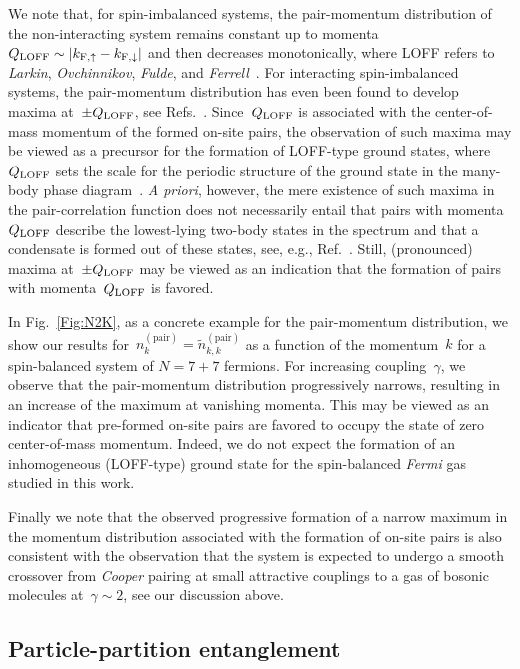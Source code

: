 \documentclass[pra,aps,groupedaddress,floatfix,twocolumn,superscriptaddress,showpacs,nofootinbib]{revtex4-1}
\begin{document}
{{{We note that, for  spin-imbalanced systems, the pair-momentum distribution
of the non-interacting system remains constant up
to momenta~$Q_{\rm LOFF}\sim |k_{{\rm F},\uparrow}-k_{{\rm F},\downarrow}|$ and then
decreases monotonically, where LOFF refers to {\it Larkin}, {\it Ovchinnikov}, {\it Fulde},
and {\it Ferrell}~\cite{FuldeFerrell64,LarkinOvchinnikov64}.
For interacting spin-imbalanced systems, the pair-momentum distribution}
has even been found to develop maxima at~$\pm Q_{\rm LOFF}$,
see Refs.~\cite{PhysRevA.78.033607,Lee:2011zzo}.
Since~$Q_{\rm LOFF}$ is associated with the center-of-mass momentum of the formed on-site pairs, the
observation of such maxima may
be viewed as a precursor for the formation of LOFF-type ground states, where~$Q_{\rm LOFF}$
sets the scale for
the periodic structure of the ground state in the many-body phase diagram~\cite{FuldeFerrell64,LarkinOvchinnikov64}.
{\it A priori}, however, the mere existence of such maxima in the pair-correlation function
does not necessarily entail that pairs with momenta~$Q_{\rm LOFF}$ describe the lowest-lying two-body
states in the spectrum and that a condensate is formed out of these states, see, e.g., Ref.~\cite{Roscher:2016chy}.
Still, (pronounced) maxima at~$\pm Q_{\rm LOFF}$
may be viewed as an indication that the formation of pairs with momenta~$Q_{\rm LOFF}$ is
favored.

In Fig.~\ref{Fig:N2K}, as a concrete example for the pair-momentum distribution, we show our results
for~$n^{(\text{pair})}_k=\tilde{n}^{(\text{pair})}_{k,k}$ as a function of the momentum~$k$
for a spin-balanced system of $N=7+7$ fermions.
For increasing coupling~$\gamma$, we observe that the pair-momentum distribution progressively narrows,
resulting in an increase of the maximum at vanishing momenta. This may be viewed as an indicator
that pre-formed on-site pairs are favored to occupy the state of zero center-of-mass momentum. Indeed,
we do not expect the {formation of an inhomogeneous (LOFF-type) ground state}
for the spin-balanced {\it Fermi} gas studied
in this work.

Finally we note that the observed {progressive
formation} of a narrow maximum in the momentum distribution associated with
the formation of on-site pairs
is also consistent with the observation that the system is expected to undergo a smooth crossover from {\it Cooper} pairing
at small attractive couplings to a gas of bosonic molecules at~$\gamma \sim 2$, see our discussion above.}
}

\subsection{Particle-partition entanglement}
\end{document}
